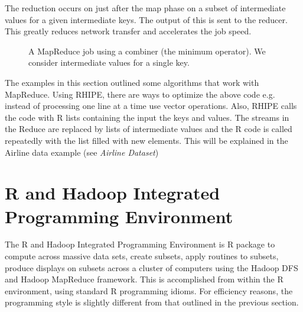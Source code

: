 \documentclass[letterpaper,10pt,english]{sphinxmanual}
\begin{document}
The reduction occurs on just after the map phase on a subset of intermediate
values for a given intermediate keys. The output of this is sent to the
reducer. This greatly reduces network transfer and accelerates the job speed.
\begin{figure}[htbp]
\centering
\capstart

\caption{A MapReduce job using a combiner (the minimum operator). We consider   intermediate values for a single key.}\end{figure}

The examples in this section outlined some algorithms that work with
MapReduce. Using RHIPE, there are ways to optimize the above code e.g. instead
of processing one line at a time use vector operations. Also, RHIPE calls the
code with R lists containing the input the keys and values. The streams in the
Reduce are replaced by lists of intermediate values and the R code is called
repeatedly with the list filled with new elements. This will be explained in the
Airline data example (see \emph{Airline Dataset})


\section{R and Hadoop Integrated Programming Environment}
\label{introduction:r-and-hadoop-integrated-programming-environment}
The R and Hadoop Integrated Programming Environment is R package to compute
across massive data sets, create subsets, apply routines to subsets, produce
displays on subsets across a cluster of computers using the Hadoop DFS and
Hadoop MapReduce framework. This is accomplished from within the R environment,
using standard R programming idioms. For efficiency reasons, the programming
style is slightly different from that outlined in the previous section.
\end{document}
